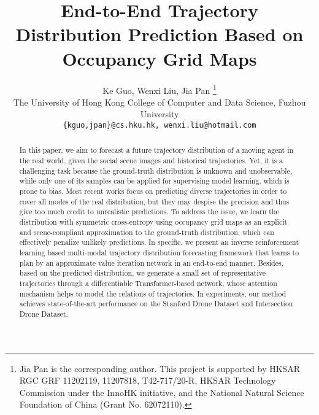 \documentclass[10pt,twocolumn,letterpaper]{article}
\begin{document}
\title{End-to-End Trajectory Distribution Prediction Based on Occupancy Grid Maps}

\author{Ke Guo, Wenxi Liu, Jia Pan 
\thanks{Jia Pan is the corresponding author. This project is supported by HKSAR RGC GRF 11202119, 11207818, T42-717/20-R, HKSAR Technology Commission under the InnoHK initiative, and the National Natural Science Foundation of China (Grant No. 62072110).}\\
The University of Hong Kong \quad College of Computer and Data Science, Fuzhou University\\
{\tt\small \{kguo,jpan\}@cs.hku.hk, wenxi.liu@hotmail.com}
}
\maketitle

\begin{abstract}
In this paper, we aim to forecast a future trajectory distribution of a moving agent in the real world, given the social scene images and historical trajectories. Yet, it is a challenging task because the ground-truth distribution is unknown and unobservable, while only one of its samples can be applied for supervising model learning, which is prone to bias. Most recent works focus on predicting diverse trajectories in order to cover all modes of the real distribution, but they may despise the precision and thus give too much credit to unrealistic predictions. To address the issue, we learn the distribution with symmetric cross-entropy using occupancy grid maps as an explicit and scene-compliant approximation to the ground-truth distribution, which can effectively penalize unlikely predictions. In specific, we present an inverse reinforcement learning based multi-modal trajectory distribution forecasting framework that learns to plan by an approximate value iteration network in an end-to-end manner. Besides, based on the predicted distribution, we generate a small set of representative trajectories through a differentiable Transformer-based network, whose attention mechanism helps to model the relations of trajectories. In experiments, our method achieves state-of-the-art performance on the Stanford Drone Dataset and Intersection Drone Dataset. 

\end{abstract}
\end{document}
